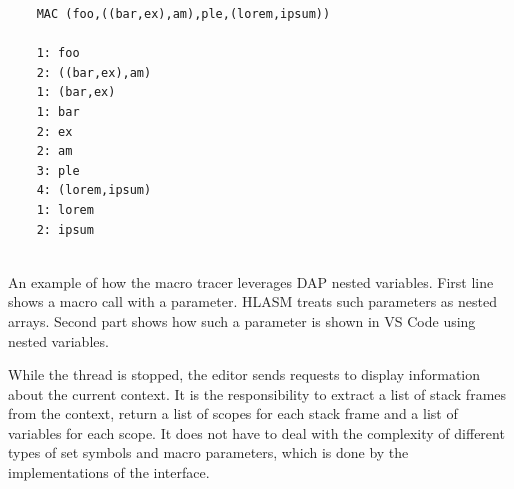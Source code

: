 \begin{listing}
	
	\begin{verbatim}
	MAC (foo,((bar,ex),am),ple,(lorem,ipsum))
	
	1: foo
	2: ((bar,ex),am)
	1: (bar,ex)
	1: bar
	2: ex
	2: am
	3: ple
	4: (lorem,ipsum)
	1: lorem
	2: ipsum
	
	\end{verbatim}
	\caption{An example of how the macro tracer leverages DAP nested variables. First line shows a macro call with a parameter. HLASM treats such parameters as nested arrays. Second part shows how such a parameter is shown in VS Code using nested variables.}
	\label{dap_nested_variables}
\end{listing}

While the thread is stopped, the editor sends requests to display information about the current context. It is the  responsibility to extract a list of stack frames from the context, return a list of scopes for each stack frame and a list of variables for each scope. It does not have to deal with the complexity of different types of set symbols and macro parameters, which is done by the implementations of the  interface.


